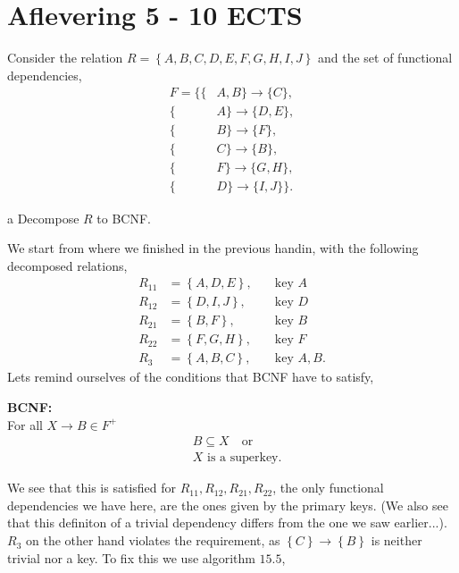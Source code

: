 \documentclass[working, oneside]{../../Preambles/tuftebook}
\newenvironment{SimpleBox}[1]{%
  \begin{mdframed}%
    \noindent\textbf{#1}\\[1ex]
}{%
  \end{mdframed}%
}
\begin{document}
\let\cleardoublepage\clearpage
\thispagestyle{fancy}
\chapter{Aflevering 5 - 10 ECTS}
\begin{exercise}[1 - BCNF]
Consider the relation $R = \left\{ A, B, C, D, E, F, G, H, I, J \right\} $ and the set of functional dependencies,
\begin{align*}
    F = \{ \{& A, B  \} \to \{ C \} ,\\
    \{ & A \} \to \{ D, E\}, \\
    \{ & B \} \to \{ F \}, \\
    \{ & C \} \to \{ B \}, \\
    \{ & F \} \to \{ G, H \}, \\
\{ & D \} \to \{ I, J \}\} 
.\end{align*}
\end{exercise}
\begin{subexercise}{a}
Decompose $R$ to BCNF.
\end{subexercise}
We start from where we finished in the previous handin, with the following decomposed relations,
\begin{align*}
    R_{11} &= \left\{ A, D, E \right\}, \quad&\text{key }A \\
    R_{12} &= \left\{ D, I, J \right\}, \quad&\text{key }D \\ 
    R_{21} &= \left\{ B, F \right\}, \quad&\text{key }B \\
    R_{22} &= \left\{ F, G, H \right\}, \quad&\text{key }F \\
    R_3 &= \left\{ A, B, C \right\}, \quad&\text{key }A, B 
.\end{align*}
Lets remind ourselves of the conditions that BCNF have to satisfy,
\begin{SimpleBox}{BCNF:}
    For all $X \to B \in F^{+}$ 
    \begin{align*}
        &B \subseteq X \quad \text{or}\\
        &X \text{ is a superkey}
    .\end{align*}
\end{SimpleBox}
We see that this is satisfied for $R_{11}, R_{12}, R_{21}, R_{22}$, the only functional dependencies we have here, are the ones given by the primary keys. (We also see that this definiton of a trivial dependency differs from the one we saw earlier...). $R_3$ on the other hand violates the requirement, as $\left\{ C \right\} \to \left\{ B \right\} $ is neither trivial nor a key. To fix this we use algorithm $15.5$,
\end{document}
